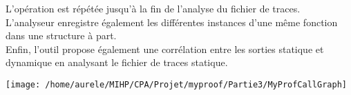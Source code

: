 \documentclass[oneside,11pt]{article}
\begin{document}
L'opération est répétée jusqu'à la fin de l'analyse du fichier de traces.\\
L'analyseur enregistre également les différentes instances d'une même fonction dans une structure à part.\\

Enfin, l'outil propose également une corrélation entre les sorties statique et dynamique en analysant le fichier de traces statique.\\

\begin{center}
	\texttt{[image: /home/aurele/MIHP/CPA/Projet/myproof/Partie3/MyProfCallGraph]}
\end{center}
\end{document}

